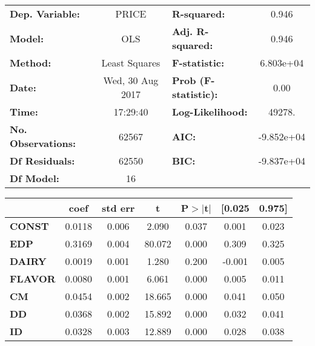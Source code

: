 \begin{center}
\begin{tabular}{lclc}
\toprule
\textbf{Dep. Variable:}    &        PRICE         & \textbf{  R-squared:         } &     0.946   \\
\textbf{Model:}            &       OLS        & \textbf{  Adj. R-squared:    } &     0.946   \\
\textbf{Method:}           &  Least Squares   & \textbf{  F-statistic:       } & 6.803e+04   \\
\textbf{Date:}             & Wed, 30 Aug 2017 & \textbf{  Prob (F-statistic):} &     0.00    \\
\textbf{Time:}             &     17:29:40     & \textbf{  Log-Likelihood:    } &    49278.   \\
\textbf{No. Observations:} &       62567      & \textbf{  AIC:               } & -9.852e+04  \\
\textbf{Df Residuals:}     &       62550      & \textbf{  BIC:               } & -9.837e+04  \\
\textbf{Df Model:}         &          16      & \textbf{                     } &             \\
\bottomrule
\end{tabular}
\begin{tabular}{lcccccc}
               & \textbf{coef} & \textbf{std err} & \textbf{t} & \textbf{P$>$$|$t$|$} & \textbf{[0.025} & \textbf{0.975]}  \\
\midrule
\textbf{CONST} &       0.0118  &        0.006     &     2.090  &         0.037        &        0.001    &        0.023     \\
\textbf{EDP}    &       0.3169  &        0.004     &    80.072  &         0.000        &        0.309    &        0.325     \\
\textbf{DAIRY}    &       0.0019  &        0.001     &     1.280  &         0.200        &       -0.001    &        0.005     \\
\textbf{FLAVOR}    &       0.0080  &        0.001     &     6.061  &         0.000        &        0.005    &        0.011     \\
\textbf{CM}    &       0.0454  &        0.002     &    18.665  &         0.000        &        0.041    &        0.050     \\
\textbf{DD}    &       0.0368  &        0.002     &    15.892  &         0.000        &        0.032    &        0.041     \\
\textbf{ID}    &       0.0328  &        0.003     &    12.889  &         0.000        &        0.028    &        0.038     \\

\end{tabular}
\end{center}
